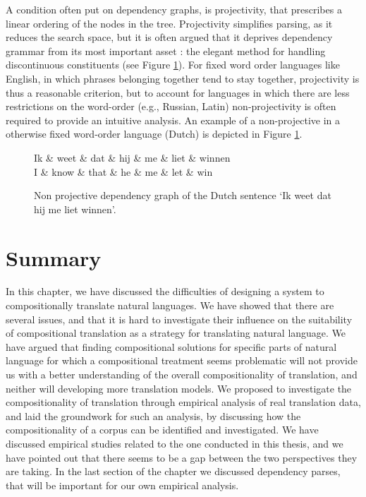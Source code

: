 A condition often put on dependency graphs, is projectivity, that prescribes a linear ordering of the nodes in the tree. Projectivity simplifies parsing, as it reduces the search space, but it is often argued that it deprives dependency grammar from its most important asset \citep{covington1990dependency,debusmann2000introduction}: the elegant method for handling discontinuous constituents (see Figure \ref{fig:npdeptree}). For fixed word order languages like English, in which phrases belonging together tend to stay together, projectivity is thus a reasonable criterion, but to account for languages in which there are less restrictions on the word-order (e.g., Russian, Latin) non-projectivity is often required to provide an intuitive analysis. An example of a non-projective in a otherwise fixed word-order language (Dutch) is depicted in Figure \ref{fig:npdeptree}.

\begin{figure}[!ht]
\centering
\begin{dependency}[theme=simple]%
\begin{deptext}[column sep=.5cm, row sep=.1ex]
Ik \& weet \& dat \& hij \& me \& liet \& winnen\\
\tiny{I} \& \tiny{know} \& \tiny{that} \& \tiny{he} \& \tiny{me} \& \tiny{let} \& \tiny{win}\\
\end{deptext}
\end{dependency}
\caption{Non projective dependency graph of the Dutch sentence `Ik weet dat hij me liet winnen'.}\label{fig:npdeptree}
\end{figure}

\section{Summary}
\label{sec:summary}

In this chapter, we have discussed the difficulties of designing a system to compositionally translate natural languages. We have showed that there are several issues, and that it is hard to investigate their influence on the suitability of compositional translation as a strategy for translating natural language. We have argued that finding compositional solutions for specific parts of natural language for which a compositional treatment seems problematic will not provide us with a better understanding of the overall compositionality of translation, and neither will developing more translation models. We proposed to investigate the compositionality of translation through empirical analysis of real translation data, and laid the groundwork for such an analysis, by discussing how the compositionality of a corpus can be identified and investigated. We have discussed empirical studies related to the one conducted in this thesis, and we have pointed out that there seems to be a gap between the two perspectives they are taking. In the last section of the chapter we discussed dependency parses, that will be important for our own empirical analysis.